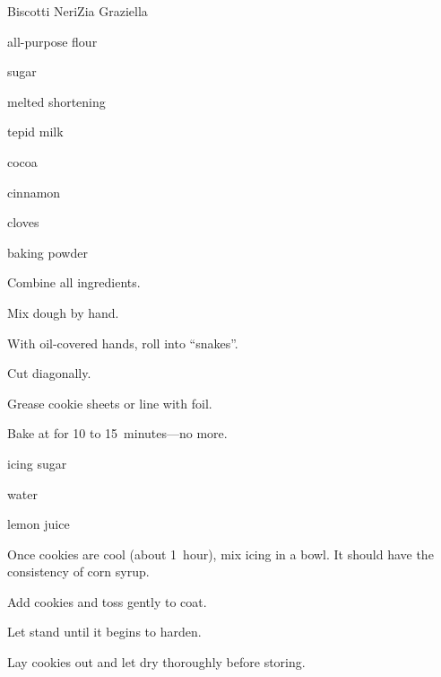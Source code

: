 \begin{recipe}{Biscotti Neri}{Zia Graziella}{}

\begin{ingredients}
\item {} all-purpose flour
\item {} sugar
\item \lbs{\half} melted shortening
\item {} tepid milk
\item {} cocoa
\item {} cinnamon
\item {} cloves
\item {} baking powder
\end{ingredients}

\begin{directions}
\item Combine all ingredients.
\item Mix dough by hand.
\item With oil-covered hands, roll into ``snakes''.
\item Cut diagonally.
\item Grease cookie sheets or line with foil.
\item Bake at  for 10 to 15~minutes---no more.
\end{directions}


\begin{ingredients}
\item icing sugar
\item water
\item lemon juice
\end{ingredients}

\begin{directions}
\item Once cookies are cool (about 1~hour), mix icing in a bowl. It should have the consistency of corn syrup.
\item Add cookies and toss gently to coat.
\item Let stand until it begins to harden.
\item Lay cookies out and let dry thoroughly before storing.
\end{directions}

\end{recipe}
